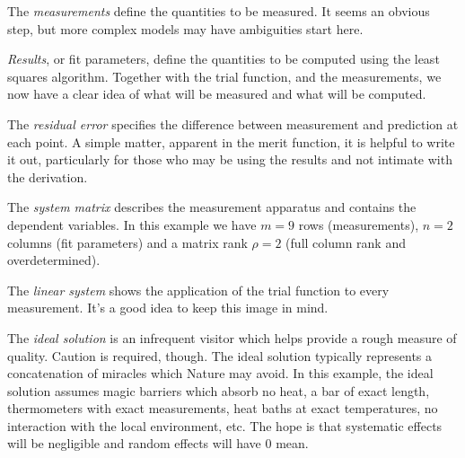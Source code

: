 The \emph{measurements} define the quantities to be measured. It seems an obvious step, but more complex models may have ambiguities start here.

\emph{Results}, or fit parameters, define the quantities to be computed using the least squares algorithm. Together with the trial function, and the measurements, we now have a clear idea of what will be measured and what will be computed.

The \emph{residual error} specifies the difference between measurement and prediction at each point. A simple matter, apparent in the merit function, it is helpful to write it out, particularly for those who may be using the results and not intimate with the derivation.

The \emph{system matrix} describes the measurement apparatus and contains the dependent variables. In this example we have $m=9$ rows (measurements), $n=2$ columns (fit parameters) and a matrix rank $\rho = 2$ (full column rank and overdetermined).

The \emph{linear system} shows the application of the trial function to every measurement. It's a good idea to keep this image in mind.

The \emph{ideal solution} is an infrequent visitor which helps provide a rough measure of quality. Caution is required, though. The ideal solution typically represents a concatenation of miracles which Nature may avoid. In this example, the ideal solution assumes magic barriers which absorb no heat, a bar of exact length, thermometers with exact measurements, heat baths at exact temperatures, no interaction with the local environment, etc. The hope is that systematic effects will be negligible and random effects will have 0 mean.

